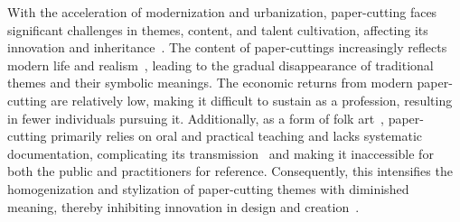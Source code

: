 
With the acceleration of modernization and urbanization, paper-cutting faces significant challenges in themes, content, and talent cultivation, affecting its innovation and inheritance~\cite{Zhang:2018:sos, Li:2023:digitalpapercut, Wang:2021:dap}. The content of paper-cuttings increasingly reflects modern life and realism~\cite{Zhang:2018:sos, Cao:2023:the}, leading to the gradual disappearance of traditional themes and their symbolic meanings. The economic returns from modern paper-cutting are relatively low, making it difficult to sustain as a profession, resulting in fewer individuals pursuing it. Additionally, as a form of folk art~\cite{Wang:2021:folk}, paper-cutting primarily relies on oral and practical teaching and lacks systematic documentation, complicating its transmission~\cite{Wang:2018:transinheritance} and making it inaccessible for both the public and practitioners for reference. Consequently, this intensifies the homogenization and stylization of paper-cutting themes with diminished meaning, thereby inhibiting innovation in design and creation~\cite{Zhang:2018:sos}.

